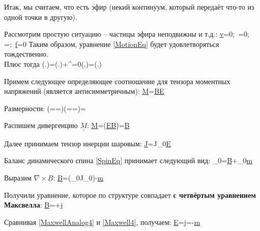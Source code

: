 \documentclass[main.tex]{subfiles}
\begin{document}
Итак, мы считаем, что есть эфир (некий континуум, который передаёт что-то из одной точки в другую).

Рассмотрим простую ситуацию -- частицы эфира неподвижны и т.д.:
\beq\label{HM1}
\underline{v}=0;\,\,\,\underline{\underline{\sigma}}=0;\,\,\,\rho=;\,\,\,\underline{f}=0
\eeq
Таким образом, уравнение \eqref{MotionEq} будет удовлетворяться тождественно.\\

Плюс тогда
\beq\label{HM2}
\left(.\right)=\left(.\right)+^{=0}\cdot\nabla\left(.\right)=\left(.\right)
\eeq

Примем следующее определяющее соотношение для тензора моментных напряжений (является антисимметричным):
\beq\label{MDef}
\underline{\underline{M}}=\mu\underline{B}\times\underline{\underline{E}}
\eeq

Размерности:
\beq
\left(==\right)\left(=\cdot{}=\right)\Rightarrow\left[\mu\right]=
\eeq

Распишем дивергенцию $\underline{\underline{M}}$:
\beq
\nabla\cdot\underline{\underline{M}}=\mu\nabla\cdot\left(\underline{\underline{E}}\times\underline{B}\right)=\mu\nabla\times\underline{B}
\eeq

Далее принимаем тензор инерции шаровым:
\beq
\underline{\underline{J}}=J_0\underline{\underline{E}}
\eeq

Баланс динамического спина \eqref{SpinEq} принимает следующий вид:
\beq
\rho_0=\mu\nabla\times\underline{B}+\rho_0\underline{m}
\eeq

Выразим $\nabla\times\underline{B}$:
\beq\label{MaxwellAnalog4}
\nabla\times\underline{B}=\left(\rho_0J_0\underline{\omega}\right)-\underline{m}
\eeq

Получили уравнение, которое по структуре совпадает \textbf{с четвёртым уравнением Максвелла}:
\beq\label{Maxwell4}
\nabla\times\underline{B}=+\underline{j}
\eeq

Сравнивая \eqref{MaxwellAnalog4} и \eqref{Maxwell4}, получаем:
\beq\label{Coeffs4}
\underline{E}=\underline{\omega}\underline{j}=-\underline{m}
\eeq
\end{document}

